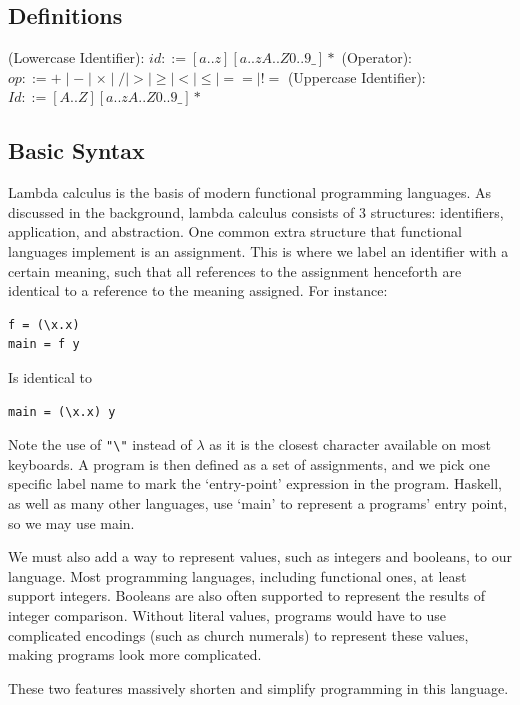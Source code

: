 \subsection{Definitions}

\begin{syntax}
\label{def:identifier_syntax}
(Lowercase Identifier): \(id ::= [a..z][a..zA..Z0..9\_]*\)\newline
(Operator): \(op ::= + \mid - \mid \times \mid / \mid > \mid \ge \mid < \mid \le \mid== \mid \mathrel{\mathtt{!=}} \)\newline
(Uppercase Identifier): \(Id ::= [A..Z][a..zA..Z0..9\_]*\)
\end{syntax}

\subsection{Basic Syntax}
Lambda calculus is the basis of modern functional programming languages. As discussed in the background, lambda calculus consists of 3 structures: identifiers, application, and abstraction. One common extra structure that functional languages implement is an assignment. This is where we label an identifier with a certain meaning, such that all references to the assignment henceforth are identical to a reference to the meaning assigned. For instance:
\begin{lstlisting}[]
f = (\x.x)
main = f y
\end{lstlisting}
Is identical to
\begin{lstlisting}[]
main = (\x.x) y
\end{lstlisting}
Note the use of \verb|"\"| instead of \(\lambda\) as it is the closest character available on most keyboards. A program is then defined as a set of assignments, and we pick one specific label name to mark the `entry-point' expression in the program. Haskell, as well as many other languages, use `main' to represent a programs' entry point, so we may use main. 

We must also add a way to represent values, such as integers and booleans, to our language. Most programming languages, including functional ones, at least support integers. Booleans are also often supported to represent the results of integer comparison. Without literal values, programs would have to use complicated encodings (such as church numerals) to represent these values, making programs look more complicated. 

These two features massively shorten and simplify programming in this language.

